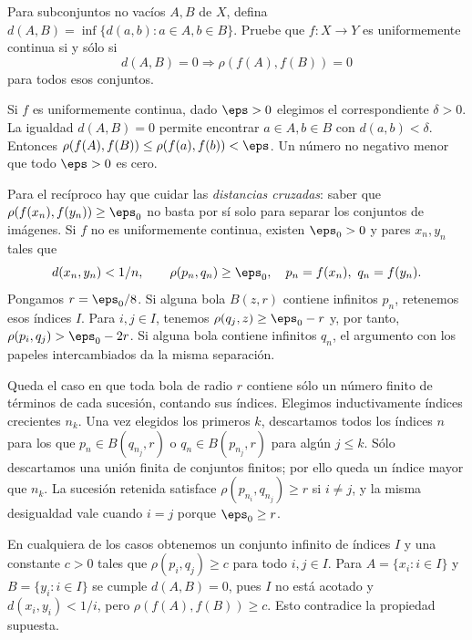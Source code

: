 \begin{ejercicio}
Para subconjuntos no vacíos $A,B$ de $X$, defina $d(A,B)=\inf\{d(a,b):a\in A,b\in B\}$. Pruebe que $f:X\to Y$ es uniformemente continua si y sólo si
\[
 d(A,B)=0\Longrightarrow\rho(f(A),f(B))=0
\]
para todos esos conjuntos.
\end{ejercicio}
\begin{solucion}
Si $f$ es uniformemente continua, dado $\eps>0$ elegimos el correspondiente $\delta>0$. La igualdad $d(A,B)=0$ permite encontrar $a\in A,b\in B$ con $d(a,b)<\delta$. Entonces $\rho(f(A),f(B))\leq\rho(f(a),f(b))<\eps$. Un número no negativo menor que todo $\eps>0$ es cero.

Para el recíproco hay que cuidar las \emph{distancias cruzadas}: saber que $\rho(f(x_n),f(y_n))\geq\eps_0$ no basta por sí solo para separar los conjuntos de imágenes. Si $f$ no es uniformemente continua, existen $\eps_0>0$ y pares $x_n,y_n$ tales que
\[
 d(x_n,y_n)<1/n,\qquad \rho(p_n,q_n)\geq\eps_0,
 \quad p_n=f(x_n),\ q_n=f(y_n).
\]
Pongamos $r=\eps_0/8$. Si alguna bola $B(z,r)$ contiene infinitos $p_n$, retenemos esos índices $I$. Para $i,j\in I$, tenemos $\rho(q_j,z)\geq\eps_0-r$ y, por tanto, $\rho(p_i,q_j)>\eps_0-2r$. Si alguna bola contiene infinitos $q_n$, el argumento con los papeles intercambiados da la misma separación.

Queda el caso en que toda bola de radio $r$ contiene sólo un número finito de términos de cada sucesión, contando sus índices. Elegimos inductivamente índices crecientes $n_k$. Una vez elegidos los primeros $k$, descartamos todos los índices $n$ para los que $p_n\in B(q_{n_j},r)$ o $q_n\in B(p_{n_j},r)$ para algún $j\leq k$. Sólo descartamos una unión finita de conjuntos finitos; por ello queda un índice mayor que $n_k$. La sucesión retenida satisface $\rho(p_{n_i},q_{n_j})\geq r$ si $i\ne j$, y la misma desigualdad vale cuando $i=j$ porque $\eps_0\geq r$.

En cualquiera de los casos obtenemos un conjunto infinito de índices $I$ y una constante $c>0$ tales que $\rho(p_i,q_j)\geq c$ para todo $i,j\in I$. Para $A=\{x_i:i\in I\}$ y $B=\{y_i:i\in I\}$ se cumple $d(A,B)=0$, pues $I$ no está acotado y $d(x_i,y_i)<1/i$, pero $\rho(f(A),f(B))\geq c$. Esto contradice la propiedad supuesta.
\end{solucion}

